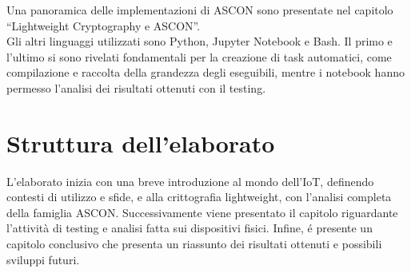 \noindent Una panoramica delle implementazioni di ASCON sono presentate nel capitolo ``Lightweight Cryptography e ASCON''. \\

\noindent Gli altri linguaggi utilizzati sono Python, Jupyter Notebook e Bash. Il primo e l'ultimo si sono rivelati fondamentali per la creazione di task automatici, come compilazione e raccolta della grandezza degli eseguibili, mentre i notebook hanno permesso l'analisi dei risultati ottenuti con il testing.

\section{Struttura dell'elaborato}

L'elaborato inizia con una breve introduzione al mondo dell'IoT, definendo contesti di utilizzo e sfide, e alla crittografia lightweight, con l'analisi completa della famiglia ASCON. Successivamente viene presentato il capitolo riguardante l'attività di testing e analisi fatta sui dispositivi fisici. Infine, é presente un capitolo conclusivo che presenta un riassunto dei risultati ottenuti e possibili sviluppi futuri.

